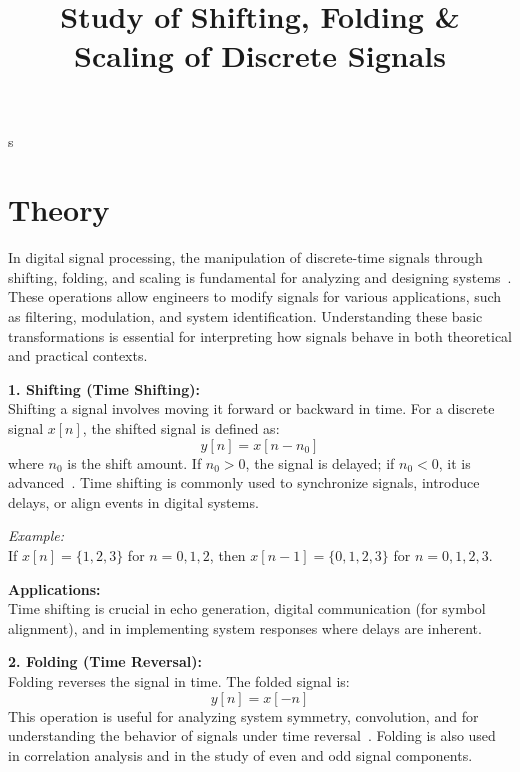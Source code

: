 \documentclass[12pt]{article}
\title{Study of Shifting, Folding \& Scaling of Discrete Signals}
\author{}
\date{}
\begin{document}
s


\pagebreak

\tableofcontents

\pagebreak
{}
\maketitle

\section*{Theory}
In digital signal processing, the manipulation of discrete-time signals through shifting, folding, and scaling is fundamental for analyzing and designing systems~\cite{salivahanan_dsp, proakis_dsp, jervis_dsp}. These operations allow engineers to modify signals for various applications, such as filtering, modulation, and system identification. Understanding these basic transformations is essential for interpreting how signals behave in both theoretical and practical contexts.

\textbf{1. Shifting (Time Shifting):} \\
Shifting a signal involves moving it forward or backward in time. For a discrete signal $x[n]$, the shifted signal is defined as:
\begin{equation}
    y[n] = x[n - n_0]
\end{equation}
where $n_0$ is the shift amount. If $n_0 > 0$, the signal is delayed; if $n_0 < 0$, it is advanced~\cite{salivahanan_dsp}. Time shifting is commonly used to synchronize signals, introduce delays, or align events in digital systems.

\textit{Example:} \\
If $x[n] = \{1, 2, 3\}$ for $n = 0, 1, 2$, then $x[n-1] = \{0, 1, 2, 3\}$ for $n = 0, 1, 2, 3$.

\textbf{Applications:} \\
Time shifting is crucial in echo generation, digital communication (for symbol alignment), and in implementing system responses where delays are inherent.

\vspace{0.5em}
\textbf{2. Folding (Time Reversal):} \\
Folding reverses the signal in time. The folded signal is:
\begin{equation}
    y[n] = x[-n]
\end{equation}
This operation is useful for analyzing system symmetry, convolution, and for understanding the behavior of signals under time reversal~\cite{proakis_dsp}. Folding is also used in correlation analysis and in the study of even and odd signal components.
\end{document}
